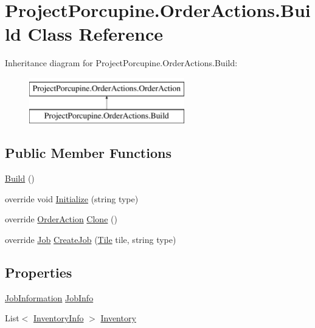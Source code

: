 \hypertarget{class_project_porcupine_1_1_order_actions_1_1_build}{}\section{Project\+Porcupine.\+Order\+Actions.\+Build Class Reference}
\label{class_project_porcupine_1_1_order_actions_1_1_build}
Inheritance diagram for Project\+Porcupine.\+Order\+Actions.\+Build\+:\begin{figure}[H]
\begin{center}
\leavevmode
\includegraphics[height=2.000000cm]{class_project_porcupine_1_1_order_actions_1_1_build}
\end{center}
\end{figure}
\subsection*{Public Member Functions}
\begin{DoxyCompactItemize}
\item 
\hyperlink{class_project_porcupine_1_1_order_actions_1_1_build_abd9690fe03fc7e392e2b9190f3d8a46c}{Build} ()
\item 
override void \hyperlink{class_project_porcupine_1_1_order_actions_1_1_build_a84f7280320250c7f7084b8c58693be58}{Initialize} (string type)
\item 
override \hyperlink{class_project_porcupine_1_1_order_actions_1_1_order_action}{Order\+Action} \hyperlink{class_project_porcupine_1_1_order_actions_1_1_build_af00322a255be2f3913556c114bead18e}{Clone} ()
\item 
override \hyperlink{class_job}{Job} \hyperlink{class_project_porcupine_1_1_order_actions_1_1_build_add124f7d8c0cea6ce9c408a4c7d4c284}{Create\+Job} (\hyperlink{class_tile}{Tile} tile, string type)
\end{DoxyCompactItemize}
\subsection*{Properties}
\begin{DoxyCompactItemize}
\item 
\hyperlink{class_project_porcupine_1_1_order_actions_1_1_order_action_1_1_job_information}{Job\+Information} \hyperlink{class_project_porcupine_1_1_order_actions_1_1_build_a9f7cbc7ac9061a9651e7f1dbfed37490}{Job\+Info}
\item 
List$<$ \hyperlink{class_project_porcupine_1_1_order_actions_1_1_order_action_1_1_inventory_info}{Inventory\+Info} $>$ \hyperlink{class_project_porcupine_1_1_order_actions_1_1_build_a17979152c918c31ce1342de97e253b86}{Inventory}
\end{DoxyCompactItemize}

